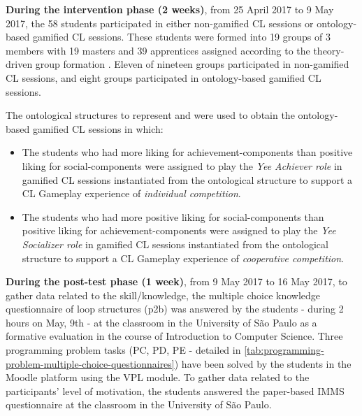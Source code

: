 \textbf{During the intervention phase (2 weeks)}, from 25 April 2017 to 9 May 2017, the 58 students participated in either non-gamified CL sessions or ontology-based gamified CL sessions. These students were formed into 19 groups of 3 members with 19 masters and 39 apprentices assigned according to the theory-driven group formation \cite{IsotaniMizoguchi2008a}. Eleven of nineteen groups participated in non-gamified CL sessions, and eight groups participated in ontology-based gamified CL sessions.

The ontological structures to represent  and  were used to obtain the ontology-based gamified CL sessions in which:
\begin{itemize}
\item The students who had more liking for achievement-components than positive liking for social-components were assigned to play the \emph{Yee Achiever role} in gamified CL sessions instantiated from the ontological structure  to support a CL Gameplay experience of \emph{individual competition}.
\item The students who had more positive liking for social-components than positive liking for achievement-components were assigned to play the \emph{Yee Socializer role} in gamified CL sessions instantiated from the ontological structure  to support a CL Gameplay experience of \emph{cooperative competition}.
\end{itemize}

\textbf{During the post-test phase (1 week)}, from 9 May 2017 to 16 May 2017, to gather data related to the skill/knowledge, the multiple choice knowledge questionnaire of loop structures (p2b) was answered by the students - during 2 hours on May, 9th - at the classroom in the University of São Paulo as a formative evaluation in the course of Introduction to Computer Science. 
Three programming problem tasks (PC, PD, PE - detailed in \autoref{tab:programming-problem-multiple-choice-questionnaires}) have been solved by the students in the Moodle platform using the VPL module. To gather data related to the participants' level of motivation, the students answered the paper-based IMMS questionnaire at the classroom in the University of São Paulo.

